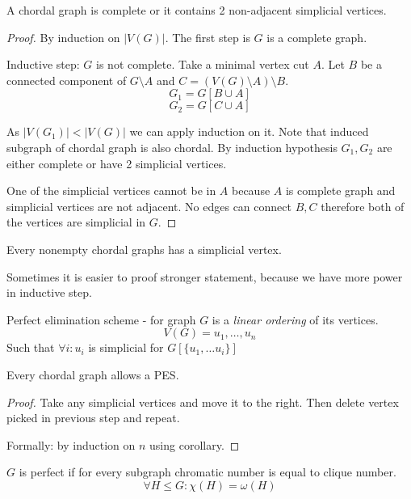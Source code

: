 \begin{lemma}[2]\label{chordal_lemma_2}
	A chordal graph is complete or it contains 2 non-adjacent simplicial vertices.
\end{lemma}
\begin{proof}
	By induction on $|V(G)|$.
	The first step is $G$ is a complete graph.

	Inductive step: $G$ is not complete.
	Take a minimal vertex cut $A$.
	Let $B$ be a connected component of $G\setminus A$ and $C = (V(G) \setminus A) \setminus B$.
	\[ G_1 = G[B \cup A] \]
	\[ G_2 = G[C \cup A] \]


	As $|V(G_1)| < |V(G)|$ we can apply induction on it.
	Note that induced subgraph of chordal graph is also chordal.
	By induction hypothesis $G_1, G_2$ are either complete or have 2 simplicial vertices.

	One of the simplicial vertices cannot be in $A$ because $A$ is complete graph and simplicial vertices are not adjacent.
	No edges can connect $B, C$ therefore both of the vertices are simplicial in $G$.
\end{proof}

\begin{corollary}
	Every nonempty chordal graphs has a simplicial vertex.
\end{corollary}

Sometimes it is easier to proof stronger statement, because we have more power in inductive step.

\begin{definition}[PES]
	Perfect elimination scheme - for graph $G$ is a \emph{linear ordering} of its vertices.
	\[ V(G) = u_1, \ldots, u_n\]
	Such that $\forall i: u_i$ is simplicial for $G[\{ u_1, \ldots u_i\}]$
\end{definition}

\begin{lemma}
	Every chordal graph allows a PES.
\end{lemma}
\begin{proof}
	Take any simplicial vertices and move it to the right.
	Then delete vertex picked in previous step and repeat.

	Formally: by induction on $n$ using corollary.
\end{proof}

\begin{definition}
	$G$ is perfect if for every subgraph chromatic number is equal to clique number.
	\[ \forall H \leq G: \chi(H) = \omega(H) \]
\end{definition}

